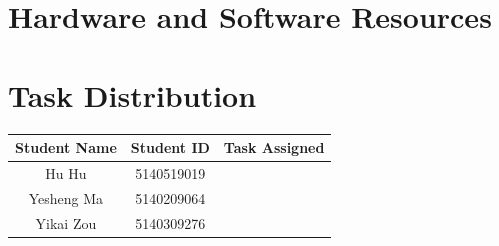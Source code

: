 \documentclass[12pt]{article}
\begin{document}
\section{Hardware and Software Resources}
\section{Task Distribution}
\begin{table}[H]
	\centering
	\begin{tabular}{|c|c|c|}
		\hline
		Student Name & Student ID & Task Assigned \\
		\hline
		Hu Hu & 5140519019 &  \\
		\hline
		Yesheng Ma & 5140209064 & \\
		\hline
		Yikai Zou & 5140309276 & \\
		\hline
	\end{tabular}
\end{table}
\end{document}

